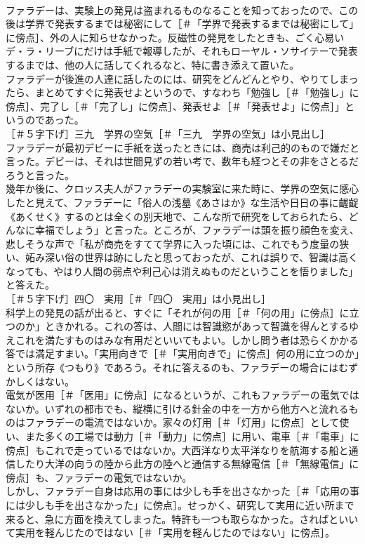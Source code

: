 \documentclass[8pt]{extreport}
\begin{document}
\begin{CJK}{UTF8}{min}
\\	ファラデーは、実験上の発見は盗まれるものなることを知っておったので、この後は学界で発表するまでは秘密にして［＃「学界で発表するまでは秘密にして」に傍点］、外の人に知らせなかった。反磁性の発見をしたときも、ごく心易いデ・ラ・リーブにだけは手紙で報導したが、それもローヤル・ソサイテーで発表するまでは、他の人に話してくれるなと、特に書き添えて置いた。
\\	ファラデーが後進の人達に話したのには、研究をどんどんとやり、やりてしまったら、まとめてすぐに発表せよというので、すなわち「勉強し［＃「勉強し」に傍点］、完了し［＃「完了し」に傍点］、発表せよ［＃「発表せよ」に傍点］」というのであった。
\\	［＃５字下げ］三九　学界の空気［＃「三九　学界の空気」は小見出し］
\\	ファラデーが最初デビーに手紙を送ったときには、商売は利己的のもので嫌だと言った。デビーは、それは世間見ずの若い考で、数年も経つとその非をさとるだろうと言った。
\\	幾年か後に、クロッス夫人がファラデーの実験室に来た時に、学界の空気に感心したと見えて、ファラデーに「俗人の浅墓《あさはか》な生活や日日の事に齷齪《あくせく》するのとは全くの別天地で、こんな所で研究をしておられたら、どんなに幸福でしょう」と言った。ところが、ファラデーは頭を振り顔色を変え、悲しそうな声で「私が商売をすてて学界に入った頃には、これでもう度量の狭い、妬み深い俗の世界は跡にしたと思っておったが、これは誤りで、智識は高くなっても、やはり人間の弱点や利己心は消えぬものだということを悟りました」と答えた。
\\	［＃５字下げ］四〇　実用［＃「四〇　実用」は小見出し］
\\	科学上の発見の話が出ると、すぐに「それが何の用［＃「何の用」に傍点］に立つのか」ときかれる。これの答は、人間には智識慾があって智識を得んとするゆえこれを満たすものはみな有用だといいてもよい。しかし問う者は恐らくかかる答では満足すまい。「実用向きで［＃「実用向きで」に傍点］何の用に立つのか」という所存《つもり》であろう。それに答えるのも、ファラデーの場合にはむずかしくはない。
\\	電気が医用［＃「医用」に傍点］になるというが、これもファラデーの電気ではないか。いずれの都市でも、縦横に引ける針金の中を一方から他方へと流れるものはファラデーの電流ではないか。家々の灯用［＃「灯用」に傍点］として使い、また多くの工場では動力［＃「動力」に傍点］に用い、電車［＃「電車」に傍点］もこれで走っているではないか。大西洋なり太平洋なりを航海する船と通信したり大洋の向うの陸から此方の陸へと通信する無線電信［＃「無線電信」に傍点］も、ファラデーの電気ではないか。
\\	しかし、ファラデー自身は応用の事には少しも手を出さなかった［＃「応用の事には少しも手を出さなかった」に傍点］。せっかく、研究して実用に近い所まで来ると、急に方面を換えてしまった。特許も一つも取らなかった。さればといいて実用を軽んじたのではない［＃「実用を軽んじたのではない」に傍点］。

\end{CJK}
\end{document}
